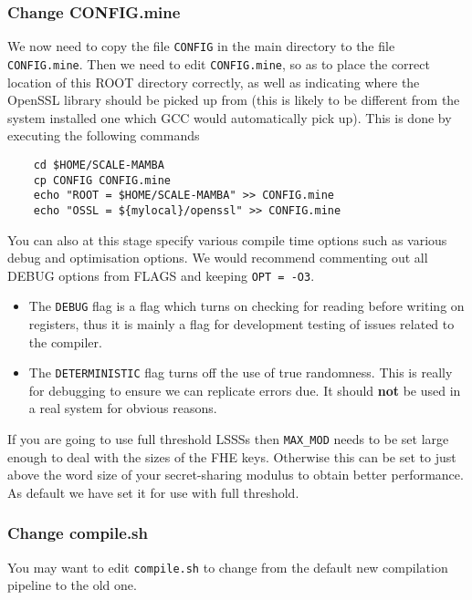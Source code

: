 \subsubsection{Change CONFIG.mine}
We now need to copy the file \verb+CONFIG+ in the main directory to the file
\verb+CONFIG.mine+.
Then we need to edit \verb+CONFIG.mine+, so as to place the correct
location of this ROOT directory correctly,
as well as indicating where the OpenSSL library should be picked up
from (this is likely to be different from the
system installed one which GCC would automatically pick up).
This is done by executing the following commands
\begin{verbatim}
    cd $HOME/SCALE-MAMBA
    cp CONFIG CONFIG.mine
    echo "ROOT = $HOME/SCALE-MAMBA" >> CONFIG.mine
    echo "OSSL = ${mylocal}/openssl" >> CONFIG.mine
\end{verbatim}
You can also at this stage specify various compile time options
such as various debug and optimisation options.
We would recommend commenting out all DEBUG options from FLAGS
and keeping \verb+OPT = -O3+.
\begin{itemize}
\item The \verb+DEBUG+ flag is a flag which turns on checking for
reading before writing on registers, thus it is mainly a flag
for development testing of issues related to the compiler.
\item The \verb+DETERMINISTIC+ flag turns off the use of true randomness.
This is really for debugging to ensure we can replicate errors due.
It should {\bf not} be used in a real system for obvious reasons.
\end{itemize}
If you are going to use full threshold LSSSs then \verb+MAX_MOD+
needs to be set large enough to deal with the sizes of the FHE
keys. Otherwise this can be set to just above the word size of your
secret-sharing modulus to obtain better performance.
As default we have set it for use with full threshold.

\subsubsection{Change compile.sh}
You may want to edit \verb+compile.sh+ to change from
the default new compilation pipeline to the old one.

